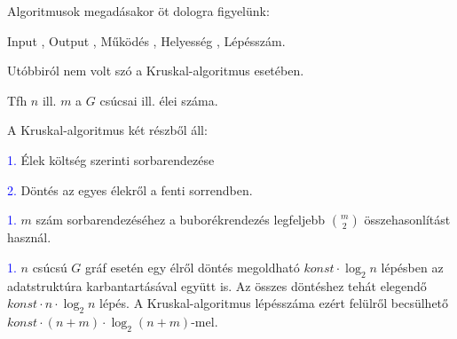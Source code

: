 \documentclass[../szamtud.tex]{subfiles}
\begin{document}
        Algoritmusok megadásakor öt dologra figyelünk:

        Input \checkmark, Output \checkmark, Működés \checkmark, Helyesség \checkmark, Lépésszám. 

        Utóbbiról nem volt szó a Kruskal-algoritmus esetében. 

        Tfh $n$ ill. $m$ a $G$ csúcsai ill. élei száma. 

        A Kruskal-algoritmus két részből áll: 

        \;\;\;\;\;\textcolor{blue}{1.} Élek költség szerinti sorbarendezése 

        \;\;\;\;\;\textcolor{blue}{2.} Döntés az egyes élekről a fenti sorrendben. 
        
        \textcolor{blue}{1.} $m$ szám sorbarendezéséhez a buborékrendezés legfeljebb $\binom{m}{2}$ összehasonlítást használ.
        
        \textcolor{blue}{1.} $n$ csúcsú $G$ gráf esetén egy élről döntés megoldható $konst \cdot \log_2n$ lépésben az adatstruktúra karbantartásával együtt is. Az összes döntéshez tehát elegendő $konst \cdot n \cdot \log_2n$ lépés. A Kruskal-algoritmus lépésszáma ezért felülről becsülhető $konst \cdot (n+m) \cdot \log_2(n+m)$-mel.
    
\end{document}
